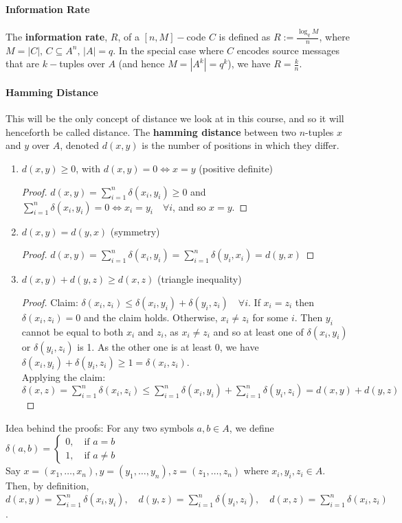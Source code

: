 \documentclass[10pt,letter]{article}
\theoremstyle{plain}
\theoremstyle{definition}
\begin{document}
\paragraph{Information Rate} 
The \textbf{information rate}, $R$, of a $[n,M]-$code $C$ is defined as $R:=\frac{\log_qM}{n}$, where $M=|C|,\,C\subseteq A^n, \,|A|=q$. In the special case where $C$ encodes source messages that are $k-$tuples over $A$ (and hence $M=|A^k|=q^k$), we have $R=\frac{k}{n}$. 

\paragraph{Hamming Distance}
This will be the only concept of distance we look at in this course, and so it will henceforth be called distance. The \textbf{hamming distance} between two $n$-tuples $x$ and $y$ over $A$, denoted $d(x,y)$ is the number of positions in which they differ.
\begin{enumerate}
    \item $d(x,y)\geq0$, with $d(x,y)=0\Leftrightarrow x=y$ (positive definite)
        \begin{proof}
            $d(x,y)=\sum_{i=1}^n\delta(x_i,y_i)\geq0$ and $\sum_{i=1}^n\delta(x_i,y_i)=0\Leftrightarrow x_i=y_i\quad\forall i$, and so $x=y$. 
        \end{proof}
    \item $d(x,y)=d(y,x)$ (symmetry)
        \begin{proof}
            $d(x,y)=\sum_{i=1}^n\delta(x_i,y_i)=\sum_{i=1}^n\delta(y_i,x_i)=d(y,x)$
        \end{proof}
    \item $d(x,y)+d(y,z)\geq d(x,z)$ (triangle inequality)
        \begin{proof}
            Claim: $\delta(x_i,z_i)\leq \delta(x_i,y_i)+\delta(y_i,z_i)\quad\forall i$. If $x_i=z_i$ then $\delta(x_i,z_i)=0$ and the claim holds. Otherwise, $x_i\neq z_i$ for some $i$. Then $y_i$ cannot be equal to both $x_i$ and $z_i$, as $x_i\neq z_i$ and so at least one of $\delta(x_i,y_i)$ or $\delta(y_i,z_i)$ is 1. As the other one is at least 0, we have $\delta(x_i,y_i)+\delta(y_i,z_i)\geq1=\delta(x_i,z_i)$. \\
            Applying the claim: $\delta(x,z)=\sum_{i=1}^n\delta(x_i,z_i)\leq\sum_{i=1}^n\delta(x_i,y_i)+\sum_{i=1}^n\delta(y_i,z_i)=d(x,y)+d(y,z)$
        \end{proof}
\end{enumerate}
Idea behind the proofs: For any two symbols $a,b\in A$, we define $\delta(a,b)=\begin{cases}0,\quad \text{if }a=b\\1,\quad\text{if }a\neq b\end{cases}$ \\ Say $x=(x_1,\ldots,x_n),y=(y_1,\ldots,y_n),z=(z_1,\ldots,z_n)$ where $x_i,y_i,z_i\in A$. Then, by definition, $d(x,y)=\sum_{i=1}^n\delta(x_i,y_i),\quad d(y,z)=\sum_{i=1}^n\delta(y_i,z_i),\quad d(x,z)=\sum_{i=1}^n\delta(x_i,z_i)$. \\ 
\end{document}
